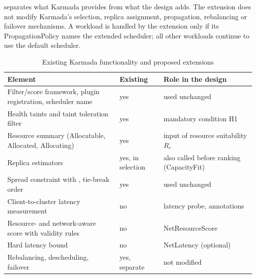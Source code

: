  separates what Karmada provides from what the design adds. The extension does not modify Karmada's selection, replica assignment, propagation, rebalancing or failover mechanisms. A workload is handled by the extension only if its PropagationPolicy names the extended scheduler; all other workloads continue to use the default scheduler.

\begin{table}[t]
\caption{Existing Karmada functionality and proposed extensions}\label{tab:existing}
\centering\small{}
\begin{tabularx}{\textwidth}{@{}Lp{2.4cm}p{5.4cm}@{}}
\toprule
\textbf{Element} & \textbf{Existing} & \textbf{Role in the design} \\
\midrule
Filter/score framework, plugin registration, scheduler name & yes & used unchanged \\
Health taints and taint toleration filter & yes & mandatory condition H1 \\
Resource summary (Allocatable, Allocated, Allocating) & yes & input of resource suitability $R_c$ \\
Replica estimators & yes, in selection & also called before ranking (CapacityFit) \\
Spread constraint with , tie-break order & yes & used unchanged \\
Client-to-cluster latency measurement & no & latency probe, annotations \\
Resource- and network-aware score with validity rules & no & NetResourceScore \\
Hard latency bound & no & NetLatency (optional) \\
Rebalancing, descheduling, failover & yes, separate & not modified \\
\bottomrule
\end{tabularx}
\end{table}
